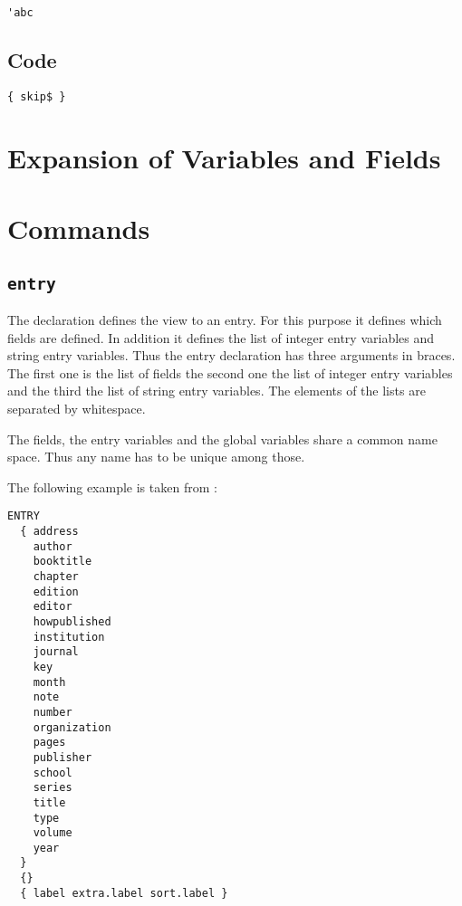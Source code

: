 \begin{lstlisting}[language=bst]
  'abc
\end{lstlisting}

\subsection{Code}\label{sec:bst.code}

\INCOMPLETE

\begin{lstlisting}[language=bst]
  { skip$ }
\end{lstlisting}

\section{Expansion of Variables and Fields}

\INCOMPLETE



\section{Commands}

\subsection{\texttt{entry}}%

The declaration defines the view to an entry. For this purpose it
defines which fields are defined. In addition it defines the list of
integer entry variables and string entry variables. Thus the entry
declaration has three arguments in braces. The first one is the list
of fields the second one the list of integer entry variables and the
third the list of string entry variables. The elements of the lists
are separated by whitespace.

The fields, the entry variables and the global variables share a
common name space. Thus any name has to be unique among those.

The following example is taken from :

\begin{lstlisting}[language=bst]
  ENTRY
  { address
    author
    booktitle
    chapter
    edition
    editor
    howpublished
    institution
    journal
    key
    month
    note
    number
    organization
    pages
    publisher
    school
    series
    title
    type
    volume
    year
  }
  {}
  { label extra.label sort.label }
\end{lstlisting}


